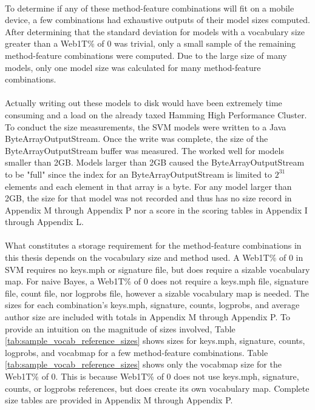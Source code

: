 	\paragraph*{}To determine if any of these method-feature combinations will fit on a mobile device, a few combinations had exhaustive outputs of their model sizes computed.  After determining that the standard deviation for models with a vocabulary size greater than a Web1T\% of 0 was trivial, only a small sample of the remaining method-feature combinations were computed.  Due to the large size of many models, only one model size was calculated for many method-feature combinations.  
	\paragraph*{} Actually writing out these models to disk would have been extremely time consuming and a load on the already taxed Hamming High Performance Cluster.  To conduct the size measurements, the SVM models were written to a Java ByteArrayOutputStream.  Once the write was complete, the size of the ByteArrayOutputStream buffer was measured.  The worked well for models smaller than 2GB.  Models larger than 2GB caused the ByteArrayOutputStream to be "full" since the index for an ByteArrayOutputStream is limited to $2^{31}$ elements and each element in that array is a byte.  For any model larger than 2GB, the size for that model was not recorded and thus has no size record in Appendix M through Appendix P nor a score in the scoring tables in Appendix I through Appendix L.
	\paragraph*{} What constitutes a storage requirement for the method-feature combinations in this thesis depends on the vocabulary size and method used.  A Web1T\% of 0 in SVM requires no keys.mph or signature file, but does require a sizable vocabulary map.  For naive Bayes, a Web1T\% of 0 does not require a keys.mph file, signature file, count file, nor logprobs file, however a sizable vocabulary map is needed.  The sizes for each combination's keys.mph, signature, counts, logprobs, and average author size are included with totals in Appendix M through Appendix P.  To provide an intuition on the magnitude of sizes involved, Table \ref{tab:sample_vocab_reference_sizes} shows sizes for keys.mph, signature, counts, logprobs, and vocabmap for a few method-feature combinations.  Table \ref{tab:sample_vocab_reference_sizes} shows only the vocabmap size for the Web1T\% of 0.  This is because Web1T\% of 0 does not use keys.mph, signature, counts, or logprobs references, but does create its own vocabulary map.  Complete size tables are provided in Appendix M through Appendix P.
	
